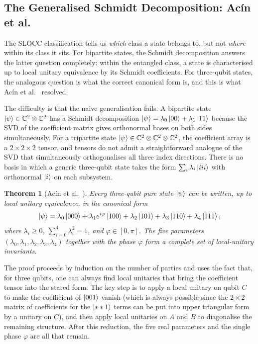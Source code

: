 \documentclass[12pt, a4paper, oneside]{report}
\theoremstyle{plain}
\newtheorem{theorem}{Theorem}[chapter]
\theoremstyle{definition}
\theoremstyle{remark}
\newcommand{\CC}{\mathbb{C}}
\begin{document}
\subsection{The Generalised Schmidt Decomposition: Acín et al.}

The SLOCC classification tells us \emph{which} class a state belongs to, but not \emph{where}
within its class it sits. For bipartite states, the Schmidt decomposition answers the latter
question completely: within the entangled class, a state is characterised up to local unitary
equivalence by its Schmidt coefficients. For three-qubit states, the analogous question is
what the correct canonical form is, and this is what Acín et al.~\cite{acin2000} resolved.

The difficulty is that the naive generalisation fails. A bipartite state $\ket{\psi}
\in \CC^2 \otimes \CC^2$ has a Schmidt decomposition $\ket{\psi} = \lambda_0\ket{00} +
\lambda_1\ket{11}$ because the SVD of the coefficient matrix gives orthonormal bases on
both sides simultaneously. For a tripartite state $\ket{\psi} \in \CC^2 \otimes \CC^2
\otimes \CC^2$, the coefficient array is a $2 \times 2 \times 2$ tensor, and tensors do not
admit a straightforward analogue of the SVD that simultaneously orthogonalises all three
index directions. There is no basis in which a generic three-qubit state takes the form
$\sum_i \lambda_i \ket{iii}$ with orthonormal $\ket{i}$ on each subsystem.

\begin{theorem}[Acín et al.~\cite{acin2000}]
\label{thm:acin}
Every three-qubit pure state $\ket{\psi}$ can be written, up to local unitary equivalence,
in the canonical form
\[
  \ket{\psi} = \lambda_0\ket{000}
             + \lambda_1 e^{i\varphi}\ket{100}
             + \lambda_2\ket{101}
             + \lambda_3\ket{110}
             + \lambda_4\ket{111},
\]
where $\lambda_i \geq 0$, $\sum_{i=0}^{4}\lambda_i^2 = 1$, and $\varphi \in [0,\pi]$. The
five parameters $(\lambda_0, \lambda_1, \lambda_2, \lambda_3, \lambda_4)$ together with the
phase $\varphi$ form a complete set of local-unitary invariants.
\end{theorem}

The proof proceeds by induction on the number of parties and uses the fact that, for
three qubits, one can always find local unitaries that bring the coefficient tensor into the
stated form. The key step is to apply a local unitary on qubit $C$ to make the coefficient
of $\ket{001}$ vanish (which is always possible since the $2\times 2$ matrix of coefficients
for the $\ket{**1}$ terms can be put into upper triangular form by a unitary on $C$), and
then apply local unitaries on $A$ and $B$ to diagonalise the remaining structure. After this
reduction, the five real parameters and the single phase $\varphi$ are all that remain.
\end{document}
